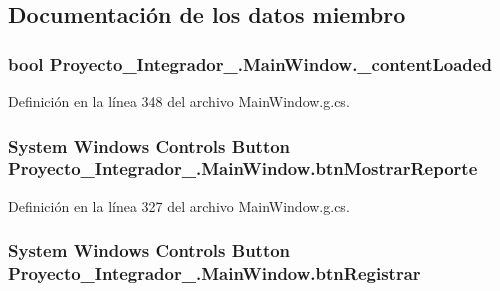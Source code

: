 \subsection{Documentación de los datos miembro}
\hypertarget{class_proyecto___integrador__3_1_1_main_window_a84896113b6d4ef07f781286dd244db94}{
\subsubsection[{\-\_\-content\-Loaded}]{\setlength{\rightskip}{0pt plus 5cm}bool Proyecto\-\_\-\-Integrador\-\_.\-Main\-Window.\-\_\-content\-Loaded\hspace{0.3cm}{\ttfamily [private]}}}\label{class_proyecto___integrador__3_1_1_main_window_a84896113b6d4ef07f781286dd244db94}


Definición en la línea 348 del archivo Main\-Window.\-g.\-cs.

\hypertarget{class_proyecto___integrador__3_1_1_main_window_a25cb685eade86d0879fa3c6f991487c5}{
\subsubsection[{btn\-Mostrar\-Reporte}]{\setlength{\rightskip}{0pt plus 5cm}System Windows Controls Button Proyecto\-\_\-\-Integrador\-\_.\-Main\-Window.\-btn\-Mostrar\-Reporte\hspace{0.3cm}{\ttfamily [package]}}}\label{class_proyecto___integrador__3_1_1_main_window_a25cb685eade86d0879fa3c6f991487c5}


Definición en la línea 327 del archivo Main\-Window.\-g.\-cs.

\hypertarget{class_proyecto___integrador__3_1_1_main_window_ac1b64fa55a6742a8f529987bfd452c80}{
\subsubsection[{btn\-Registrar}]{\setlength{\rightskip}{0pt plus 5cm}System Windows Controls Button Proyecto\-\_\-\-Integrador\-\_.\-Main\-Window.\-btn\-Registrar\hspace{0.3cm}{\ttfamily [package]}}}\label{class_proyecto___integrador__3_1_1_main_window_ac1b64fa55a6742a8f529987bfd452c80}


